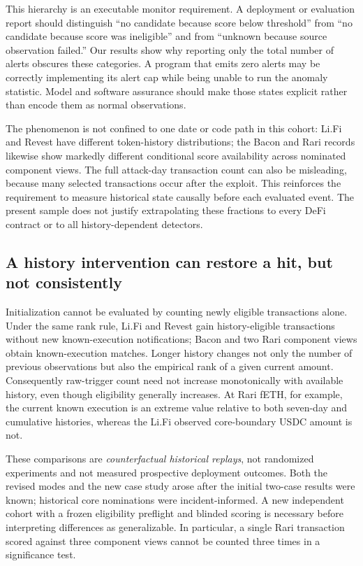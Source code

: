 \documentclass[preprint,12pt,authoryear]{elsarticle}
\begin{document}
This hierarchy is an executable monitor requirement. A deployment or evaluation report should distinguish ``no candidate because score below threshold'' from ``no candidate because score was ineligible'' and from ``unknown because source observation failed.'' Our results show why reporting only the total number of alerts obscures these categories. A program that emits zero alerts may be correctly implementing its alert cap while being unable to run the anomaly statistic. Model and software assurance should make those states explicit rather than encode them as normal observations.

The phenomenon is not confined to one date or code path in this cohort: Li.Fi and Revest have different token-history distributions; the Bacon and Rari records likewise show markedly different conditional score availability across nominated component views. The full attack-day transaction count can also be misleading, because many selected transactions occur after the exploit. This reinforces the requirement to measure historical state causally before each evaluated event. The present sample does not justify extrapolating these fractions to every DeFi contract or to all history-dependent detectors.

\subsection{A history intervention can restore a hit, but not consistently}
Initialization cannot be evaluated by counting newly eligible transactions alone. Under the same rank rule, Li.Fi and Revest gain history-eligible transactions without new known-execution notifications; Bacon and two Rari component views obtain known-execution matches. Longer history changes not only the number of previous observations but also the empirical rank of a given current amount. Consequently raw-trigger count need not increase monotonically with available history, even though eligibility generally increases. At Rari fETH, for example, the current known execution is an extreme value relative to both seven-day and cumulative histories, whereas the Li.Fi observed core-boundary USDC amount is not.

These comparisons are \emph{counterfactual historical replays}, not randomized experiments and not measured prospective deployment outcomes. Both the revised modes and the new case study arose after the initial two-case results were known; historical core nominations were incident-informed. A new independent cohort with a frozen eligibility preflight and blinded scoring is necessary before interpreting differences as generalizable. In particular, a single Rari transaction scored against three component views cannot be counted three times in a significance test.
\end{document}
